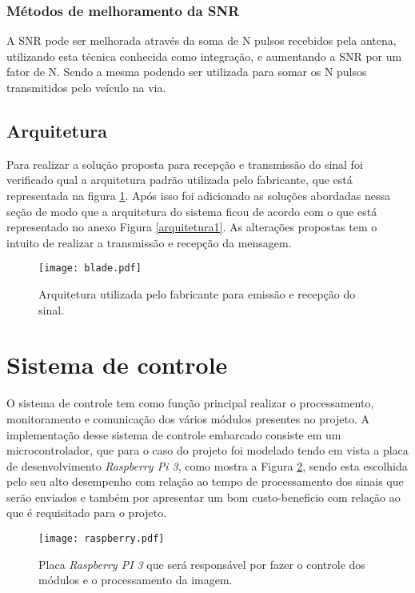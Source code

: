  
\subsubsection{Métodos de melhoramento da SNR}%
A SNR pode ser melhorada através da soma de N pulsos recebidos pela antena, utilizando esta técnica conhecida como integração, %
e aumentando a SNR por um fator de N. Sendo a mesma podendo ser utilizada para somar os N pulsos transmitidos pelo veículo na via.


\subsection{Arquitetura}

Para realizar a solução proposta para recepção e transmissão do sinal foi verificado qual a arquitetura padrão utilizada pelo fabricante, que está representada na figura \ref{arquitetura}. Após isso foi adicionado as soluções abordadas nessa seção de modo que a arquitetura do sistema ficou de acordo com o que está representado no anexo  Figura \ref{arquitetura1}. As alterações propostas tem o intuito de realizar a transmissão e recepção da mensagem.
\begin{figure}[H]
    \centering
   \texttt{[image: blade.pdf]}
   \caption{Arquitetura utilizada pelo fabricante para emissão e recepção do sinal.}
   \label{arquitetura}
    \end{figure}
    
        
\section{Sistema de controle}
    O sistema de controle tem como função principal realizar o processamento, monitoramento e comunicação dos vários módulos presentes no projeto. A implementação desse sistema de controle embarcado consiste em um microcontrolador, que para o caso do projeto foi modelado tendo em vista a placa de desenvolvimento \emph{Raspberry Pi 3}, como mostra a Figura \ref{raspberry}, sendo esta escolhida pelo seu alto desempenho com relação ao tempo de processamento dos sinais que serão enviados e também por apresentar um bom custo-beneficio com relação ao que é requisitado para o projeto. 
    
    \begin{figure}[H]
    \centering
   \texttt{[image: raspberry.pdf]}
   \caption{Placa \emph{Raspberry PI 3} que será responsável por fazer o controle dos módulos e o processamento da imagem.}
   \label{raspberry}
    \end{figure}
    
